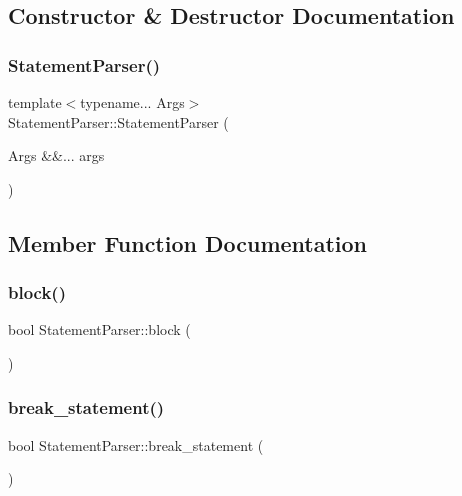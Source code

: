 \subsection{Constructor \& Destructor Documentation}
\mbox{\label{class_statement_parser_a7885370fe572ed1f0628ed8795b33d1a}} 
\subsubsection{\texorpdfstring{Statement\+Parser()}{StatementParser()}}
{\footnotesize\ttfamily template$<$typename... Args$>$ \\
Statement\+Parser\+::\+Statement\+Parser (\begin{DoxyParamCaption}\item[{Args \&\&...}]{args }\end{DoxyParamCaption})\hspace{0.3cm}{\ttfamily [inline]}}



\subsection{Member Function Documentation}
\mbox{\label{class_statement_parser_ab854015d1373cc34cb4f0c17545d2c25}} 
\subsubsection{\texorpdfstring{block()}{block()}}
{\footnotesize\ttfamily bool Statement\+Parser\+::block (\begin{DoxyParamCaption}{ }\end{DoxyParamCaption})\hspace{0.3cm}{\ttfamily [inline]}}

\mbox{\label{class_statement_parser_ae665f84bdb0e6b68659ddd5d4d7517de}} 
\subsubsection{\texorpdfstring{break\+\_\+statement()}{break\_statement()}}
{\footnotesize\ttfamily bool Statement\+Parser\+::break\+\_\+statement (\begin{DoxyParamCaption}{ }\end{DoxyParamCaption})\hspace{0.3cm}{\ttfamily [inline]}}

